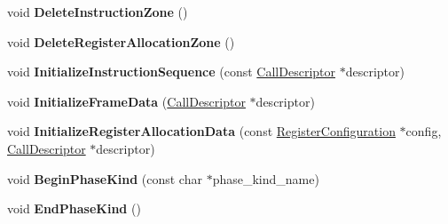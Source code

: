 \begin{DoxyCompactItemize}
\item 
void {\bfseries Delete\+Instruction\+Zone} ()\hypertarget{classv8_1_1internal_1_1compiler_1_1_pipeline_data_abbfbbfdb1a7fd8b09b8765c4c5d7e7cf}{}\label{classv8_1_1internal_1_1compiler_1_1_pipeline_data_abbfbbfdb1a7fd8b09b8765c4c5d7e7cf}

\item 
void {\bfseries Delete\+Register\+Allocation\+Zone} ()\hypertarget{classv8_1_1internal_1_1compiler_1_1_pipeline_data_ab895056e988516e0b6cbb16a3b37dfc3}{}\label{classv8_1_1internal_1_1compiler_1_1_pipeline_data_ab895056e988516e0b6cbb16a3b37dfc3}

\item 
void {\bfseries Initialize\+Instruction\+Sequence} (const \hyperlink{classv8_1_1internal_1_1compiler_1_1_call_descriptor}{Call\+Descriptor} $\ast$descriptor)\hypertarget{classv8_1_1internal_1_1compiler_1_1_pipeline_data_ae1004a52562525f530242d46a9724172}{}\label{classv8_1_1internal_1_1compiler_1_1_pipeline_data_ae1004a52562525f530242d46a9724172}

\item 
void {\bfseries Initialize\+Frame\+Data} (\hyperlink{classv8_1_1internal_1_1compiler_1_1_call_descriptor}{Call\+Descriptor} $\ast$descriptor)\hypertarget{classv8_1_1internal_1_1compiler_1_1_pipeline_data_ab64aa72dd99f329add06d77e6be3794b}{}\label{classv8_1_1internal_1_1compiler_1_1_pipeline_data_ab64aa72dd99f329add06d77e6be3794b}

\item 
void {\bfseries Initialize\+Register\+Allocation\+Data} (const \hyperlink{classv8_1_1internal_1_1_register_configuration}{Register\+Configuration} $\ast$config, \hyperlink{classv8_1_1internal_1_1compiler_1_1_call_descriptor}{Call\+Descriptor} $\ast$descriptor)\hypertarget{classv8_1_1internal_1_1compiler_1_1_pipeline_data_aef32a8745632bb07c1628dfbc3d1ef08}{}\label{classv8_1_1internal_1_1compiler_1_1_pipeline_data_aef32a8745632bb07c1628dfbc3d1ef08}

\item 
void {\bfseries Begin\+Phase\+Kind} (const char $\ast$phase\+\_\+kind\+\_\+name)\hypertarget{classv8_1_1internal_1_1compiler_1_1_pipeline_data_a6be39334fac07daf70b50441d226e01f}{}\label{classv8_1_1internal_1_1compiler_1_1_pipeline_data_a6be39334fac07daf70b50441d226e01f}

\item 
void {\bfseries End\+Phase\+Kind} ()\hypertarget{classv8_1_1internal_1_1compiler_1_1_pipeline_data_a58cc6f9b8e537fbd37b97d5384292e5f}{}\label{classv8_1_1internal_1_1compiler_1_1_pipeline_data_a58cc6f9b8e537fbd37b97d5384292e5f}

\end{DoxyCompactItemize}
